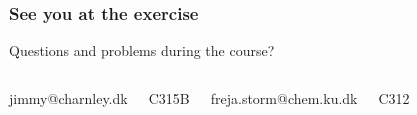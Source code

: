 
\frame
{
    \frametitle{See you at the exercise}

    \centering

    Questions and problems during the course?

    \begin{columns}[t]


            \centering
            \bigskip
            jimmy@charnley.dk

            \bigskip
            C315B


            \centering
            \bigskip
            freja.storm@chem.ku.dk

            \bigskip
            C312

    \end{columns}

}







